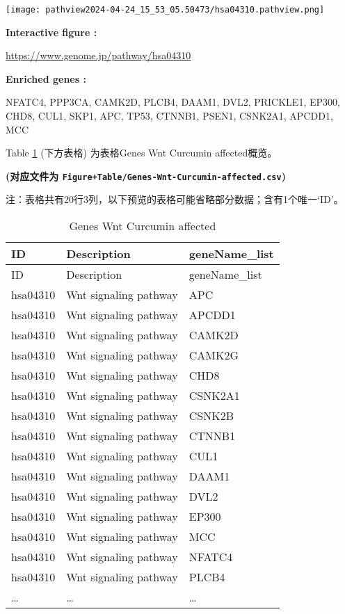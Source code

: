 \documentclass[
]{article}
\begin{document}
\def\@captype{figure}
\begin{center}
\texttt{[image: pathview2024-04-24\_15\_53\_05.50473/hsa04310.pathview.png]}
\caption{DEG hsa04310 visualization}\label{fig:DEG-hsa04310-visualization}
\end{center}
\begin{center}\begin{tcolorbox}[colback=gray!10, colframe=gray!50, width=0.9\linewidth, arc=1mm, boxrule=0.5pt]
\textbf{
Interactive figure
:}

\vspace{0.5em}

    \url{https://www.genome.jp/pathway/hsa04310}

\vspace{2em}


\textbf{
Enriched genes
:}

\vspace{0.5em}

    NFATC4, PPP3CA, CAMK2D, PLCB4, DAAM1, DVL2, PRICKLE1,
EP300, CHD8, CUL1, SKP1, APC, TP53, CTNNB1, PSEN1, CSNK2A1,
APCDD1, MCC

\vspace{2em}
\end{tcolorbox}
\end{center}

Table \ref{tab:Genes-Wnt-Curcumin-affected} (下方表格) 为表格Genes Wnt Curcumin affected概览。

\textbf{(对应文件为 \texttt{Figure+Table/Genes-Wnt-Curcumin-affected.csv})}

\begin{center}\begin{tcolorbox}[colback=gray!10, colframe=gray!50, width=0.9\linewidth, arc=1mm, boxrule=0.5pt]注：表格共有20行3列，以下预览的表格可能省略部分数据；含有1个唯一`ID'。
\end{tcolorbox}
\end{center}

\begin{longtable}[]{@{}lll@{}}
\caption{\label{tab:Genes-Wnt-Curcumin-affected}Genes Wnt Curcumin affected}\tabularnewline
\toprule
ID & Description & geneName\_list\tabularnewline
\midrule
\endfirsthead
\toprule
ID & Description & geneName\_list\tabularnewline
\midrule
\endhead
hsa04310 & Wnt signaling pathway & APC\tabularnewline
hsa04310 & Wnt signaling pathway & APCDD1\tabularnewline
hsa04310 & Wnt signaling pathway & CAMK2D\tabularnewline
hsa04310 & Wnt signaling pathway & CAMK2G\tabularnewline
hsa04310 & Wnt signaling pathway & CHD8\tabularnewline
hsa04310 & Wnt signaling pathway & CSNK2A1\tabularnewline
hsa04310 & Wnt signaling pathway & CSNK2B\tabularnewline
hsa04310 & Wnt signaling pathway & CTNNB1\tabularnewline
hsa04310 & Wnt signaling pathway & CUL1\tabularnewline
hsa04310 & Wnt signaling pathway & DAAM1\tabularnewline
hsa04310 & Wnt signaling pathway & DVL2\tabularnewline
hsa04310 & Wnt signaling pathway & EP300\tabularnewline
hsa04310 & Wnt signaling pathway & MCC\tabularnewline
hsa04310 & Wnt signaling pathway & NFATC4\tabularnewline
hsa04310 & Wnt signaling pathway & PLCB4\tabularnewline
\ldots{} & \ldots{} & \ldots{}\tabularnewline
\bottomrule
\end{longtable}
\end{document}
